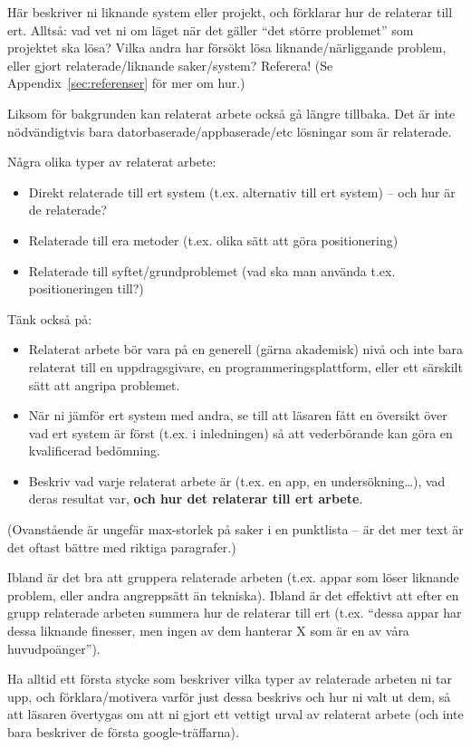 Här beskriver ni liknande system eller projekt, och förklarar hur de relaterar till ert.  Alltså: vad vet ni om läget när det gäller ``det större problemet'' som projektet ska lösa?  Vilka andra har försökt lösa liknande/närliggande problem, eller gjort relaterade/liknande saker/system? Referera! (Se Appendix~\ref{sec:referenser} för mer om hur.)

Liksom för bakgrunden kan relaterat arbete också gå längre tillbaka. Det är inte nöd\-vän\-digt\-vis bara datorbaserade/appbaserade/etc lösningar som är relaterade.

Några olika typer av relaterat arbete:
\begin{itemize}
\item Direkt relaterade till ert system (t.ex. alternativ till ert system) – och hur är de relaterade?
\item Relaterade till era metoder (t.ex. olika sätt att göra positionering)
\item Relaterade till syftet/grundproblemet (vad ska man använda t.ex. positioneringen till?)
\end{itemize}

Tänk också på:

\begin{itemize}
\item 
  Relaterat arbete bör vara på en generell (gärna akademisk) nivå och inte bara relaterat till en uppdragsgivare, en programmeringsplattform, eller ett särskilt sätt att angripa problemet.
\item 
  När ni jämför ert system med andra, se till att läsaren fått en översikt över vad ert system är först (t.ex. i inledningen) så att vederbörande kan göra en kvalificerad bedömning.
\item
 Beskriv vad varje relaterat arbete är (t.ex. en app, en undersökning\ldots), vad deras resultat var, \textbf{och hur det relaterar till ert arbete}.
\end{itemize}

(Ovanstående är ungefär max-storlek på saker i en punktlista -- är det mer text är det oftast bättre med riktiga paragrafer.)

Ibland är det bra att gruppera relaterade arbeten (t.ex. appar som löser liknande problem, eller andra angreppsätt än tekniska).
Ibland är det effektivt att efter en grupp relaterade arbeten summera hur de relaterar till ert (t.ex. ``dessa appar har dessa liknande finesser, men ingen av dem hanterar X som är en av våra huvudpoänger'').

Ha alltid ett första stycke som beskriver vilka typer av relaterade arbeten ni tar upp, och förklara/motivera varför just dessa beskrivs och hur ni valt ut dem, så att läsaren övertygas om att ni gjort ett vettigt urval av relaterat arbete (och inte bara beskriver de första google-träffarna). 


